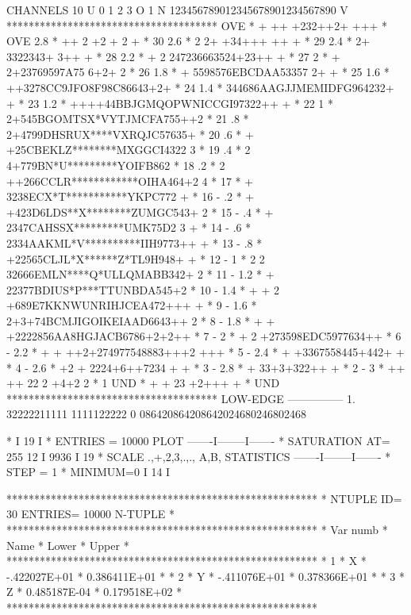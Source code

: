 \begin{Fighere}
\begin{XMPfont}{6}
CHANNELS  10 U 0        1         2         3 O
           1 N 123456789012345678901234567890 V
           **************************************
  OVE      *        + ++ +232++2+ +++           * OVE
    2.8    *      ++ 2    +2 + 2  +             *  30
    2.6    *           2 2+  +34+++ ++   +      *  29
    2.4    *          2+ 3322343+ 3++ +         *  28
    2.2    *    + 2    247236663524+23++   +    *  27
    2      *    +    2+23769597A75 6+2+ 2       *  26
    1.8    *       + 5598576EBCDAA53357  2+ +   *  25
    1.6    *      ++3278CC9JFO8F98C86643+2+     *  24
    1.4    *      344686AAGJJMEMIDFG964232+   + *  23
    1.2    *    ++++44BBJGMQOPWNICCGI97322++  + *  22
    1      *     2+545BGOMTSX*VYTJMCFA755++2    *  21
     .8    *    2+4799DHSRUX****VXRQJC57635+    *  20
     .6    *   + +25CBEKLZ********MXGGCI4322  3 *  19
     .4    * 2   4+779BN*U*********YOIFB862     *  18
     .2    * 2 ++266CCLR************OIHA464+2 4 *  17
           * +  3238ECX*T***********YKPC772   + *  16
-    .2    * + +423D6LDS**X********ZUMGC543+  2 *  15
-    .4    * +  2347CAHSSX*********UMK75D2 3  + *  14
-    .6    *   2334AAKML*V**********IIH9773++ + *  13
-    .8    *   +22565CLJL*X******Z*TL9H948+ +   *  12
-   1      * 2 2 32666EMLN****Q*ULLQMABB342+  2 *  11
-   1.2    *   + 22377BDIUS*P***TTUNBDA545+2    *  10
-   1.4    * + + 2 +689E7KKNWUNRIHJCEA472+++  + *   9
-   1.6    *     2+3+74BCMJIGOIKEIAAD6643++   2 *   8
-   1.8    * + + +2222856AA8HGJACB6786+2+2++    *   7
-   2      *   +   2 +273598EDC5977634++        *   6
-   2.2    * +   + ++2+274977548883+++2 +++     *   5
-   2.4    *         +  +3367558445+442+   +    *   4
-   2.6    *       +2 +  2224+6++7234 +    +    *   3
-   2.8    *          +  33+3+322++ +           *   2
-   3      *       ++ ++ 22 2 +4+2 2            *   1
  UND      *          + +  23 +2+++      +      * UND
           **************************************
LOW-EDGE       ---------------
           1.  32222211111         1111122222
           0   086420864208642024680246802468
 
*                                                   I    19  I
* ENTRIES =    10000            PLOT         -------I--------I-------
* SATURATION  AT=          255                  12  I  9936  I   19
* SCALE  .,+,2,3,.,., A,B,      STATISTICS   -------I--------I-------
* STEP =    1     * MINIMUM=0                       I    14  I
\end{XMPfont}
\NODOC{\end{minipage}}
\begin{XMP}
********************************************************
* NTUPLE ID=   30  ENTRIES=  10000   N-TUPLE           *
********************************************************
*  Var numb  *   Name    *    Lower     *    Upper     *
********************************************************
*      1     *    X      * -.422027E+01 * 0.386411E+01 *
*      2     *    Y      * -.411076E+01 * 0.378366E+01 *
*      3     *    Z      * 0.485187E-04 * 0.179518E+02 *
********************************************************
 

\end{XMP}
\end{Fighere}
